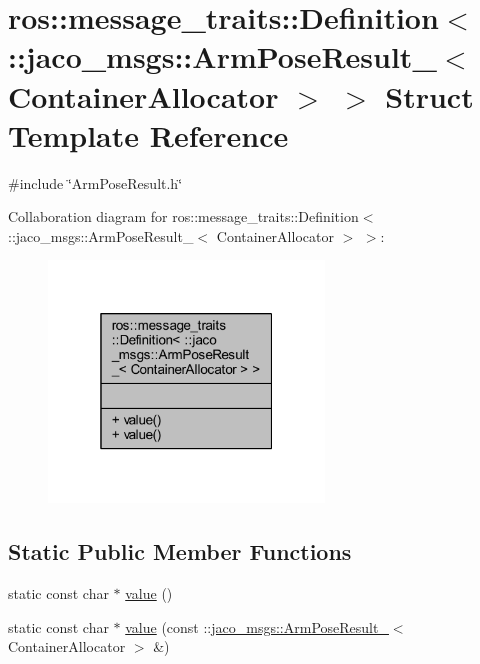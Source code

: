 \hypertarget{structros_1_1message__traits_1_1Definition_3_01_1_1jaco__msgs_1_1ArmPoseResult___3_01ContainerAllocator_01_4_01_4}{}\section{ros\+:\+:message\+\_\+traits\+:\+:Definition$<$ \+:\+:jaco\+\_\+msgs\+:\+:Arm\+Pose\+Result\+\_\+$<$ Container\+Allocator $>$ $>$ Struct Template Reference}
\label{structros_1_1message__traits_1_1Definition_3_01_1_1jaco__msgs_1_1ArmPoseResult___3_01ContainerAllocator_01_4_01_4}


{\ttfamily \#include \char`\"{}Arm\+Pose\+Result.\+h\char`\"{}}



Collaboration diagram for ros\+:\+:message\+\_\+traits\+:\+:Definition$<$ \+:\+:jaco\+\_\+msgs\+:\+:Arm\+Pose\+Result\+\_\+$<$ Container\+Allocator $>$ $>$\+:
\nopagebreak
\begin{figure}[H]
\begin{center}
\leavevmode
\includegraphics[width=208pt]{d4/d6c/structros_1_1message__traits_1_1Definition_3_01_1_1jaco__msgs_1_1ArmPoseResult___3_01ContainerAllocator_01_4_01_4__coll__graph}
\end{center}
\end{figure}
\subsection*{Static Public Member Functions}
\begin{DoxyCompactItemize}
\item 
static const char $\ast$ \hyperlink{structros_1_1message__traits_1_1Definition_3_01_1_1jaco__msgs_1_1ArmPoseResult___3_01ContainerAllocator_01_4_01_4_ad04868355b7b0f27856f7fdaeb2bcb34}{value} ()
\item 
static const char $\ast$ \hyperlink{structros_1_1message__traits_1_1Definition_3_01_1_1jaco__msgs_1_1ArmPoseResult___3_01ContainerAllocator_01_4_01_4_a4faf83234effa191862d120bab87b613}{value} (const \+::\hyperlink{structjaco__msgs_1_1ArmPoseResult__}{jaco\+\_\+msgs\+::\+Arm\+Pose\+Result\+\_\+}$<$ Container\+Allocator $>$ \&)
\end{DoxyCompactItemize}


